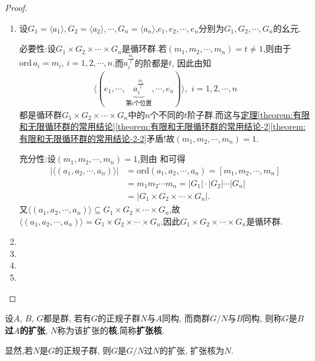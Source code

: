 \documentclass[../../main.tex]{subfiles}%
\begin{document}
\begin{proof}
\begin{enumerate}[(1)]
\item 设$G_1 = \langle a_1 \rangle,G_2 = \langle a_2 \rangle,\cdots ,G_n=\langle a_n \rangle$,$e_1,e_2,\cdots,e_n$分别为$G_1,G_2,\cdots,G_n$的幺元.

{\heiti 必要性:}设$G_1\times G_2\times\cdots\times G_n$是循环群.若$(m_1,m_2,\cdots,m_n)=t\ne1$,则由于$\text{ord}\,a_i=m_i,\,i=1,2,\cdots,n$.而$a_{i}^{\frac{m_i}{t}}$的阶都是$t$,
因此由知
\begin{align*}
\langle (e_1,\cdots ,\underset{\text{第}i\text{个位置}}{\underbrace{a_{i}^{\frac{m_i}{t}}}},\cdots ,e_n)\rangle ,\,\,i=1,2,\cdots ,n
\end{align*}
都是循环群$G_1\times G_2\times\cdots\times G_n$中的$n$个不同的$t$阶子群.而这与\hyperref[theorem:有限和无限循环群的常用结论-2-2]{定理\ref{theorem:有限和无限循环群的常用结论}\ref{theorem:有限和无限循环群的常用结论-2}\ref{theorem:有限和无限循环群的常用结论-2-2}}矛盾!故$(m_1,m_2,\cdots,m_n)=1$.

{\heiti 充分性:}设$(m_1,m_2,\cdots,m_n)=1$,则由
和可得
\begin{align*}
|\langle (a_1,a_2,\cdots ,a_n)\rangle |&=\mathrm{ord}(a_1,a_2,\cdots ,a_n)=[m_1,m_2,\cdots ,m_n]
\\
&=m_1m_2\cdots m_n=|G_1|\cdot |G_2|\cdots |G_n|
\\
&=|G_1\times G_2\times \cdots \times G_n|.
\end{align*}
又$\langle(a_1,a_2,\cdots,a_n)\rangle\subseteq G_1\times G_2\times\cdots\times G_n$,故$\langle(a_1,a_2,\cdots,a_n)\rangle=G_1\times G_2\times\cdots\times G_n$.因此$G_1\times G_2\times\cdots\times G_n$是循环群.

\item 

\item 

\item 

\item 
\end{enumerate}
\end{proof}

\begin{definition}
设$A$, $B$, $G$都是群, 若有$G$的正规子群$N$与$A$同构, 而商群$G/N$与$B$同构, 则称$G$是\textbf{$B$过$A$的扩张}, $N$称为该扩张的\textbf{核},简称\textbf{扩张核}.
\end{definition}
\begin{remark}
显然,若$N$是$G$的正规子群, 则$G$是$G/N$过$N$的扩张, 扩张核为$N$.
\end{remark}
\end{document}
